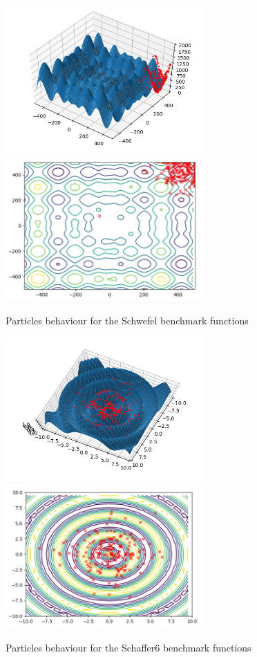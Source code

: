 \documentclass[journal,onecolumn]{IEEEtran}
\begin{document}
\begin{figure}[H]
\centering
\captionsetup{justification=centering}
\includegraphics[width=3.0in]{_img/img_PSO_test_2d_schwefel_3dview.png}
\includegraphics[width=3.0in]{_img/img_PSO_test_2d_schwefel_contours.png}
\caption{Particles behaviour for the Schwefel benchmark functions}
\end{figure}

\begin{figure}[H]
\centering
\captionsetup{justification=centering}
\includegraphics[width=3.0in]{_img/img_PSO_test_2d_schafferfcn6_3dview.png}
\includegraphics[width=3.0in]{_img/img_PSO_test_2d_schafferfcn6_contours.png}
\caption{Particles behaviour for the Schaffer6 benchmark functions}
\end{figure}
\end{document}
